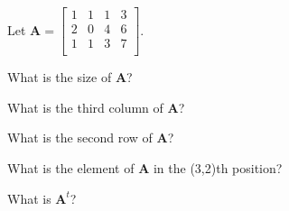 
%
%
%

	Let $\mathbf{A} = \begin{bmatrix}
	1 & 1 & 1 & 3 \\
	2 & 0 & 4 & 6 \\
	1 & 1 & 3 & 7 \\
	\end{bmatrix}$.
	\begin{subproblem}
		\item What is the size of $\mathbf{A}$?
		\item What is the third column of $\mathbf{A}$?
		\item What is the second row of $\mathbf{A}$?
		\item What is the element of $\mathbf{A}$ in the (3,2)th position?
		\item What is $\mathbf{A}^t$?
	\end{subproblem}

\solution
	\begin{subproblem}
		\item 
		\item 
		\item 
		\item 
		\item 
	\end{subproblem}
